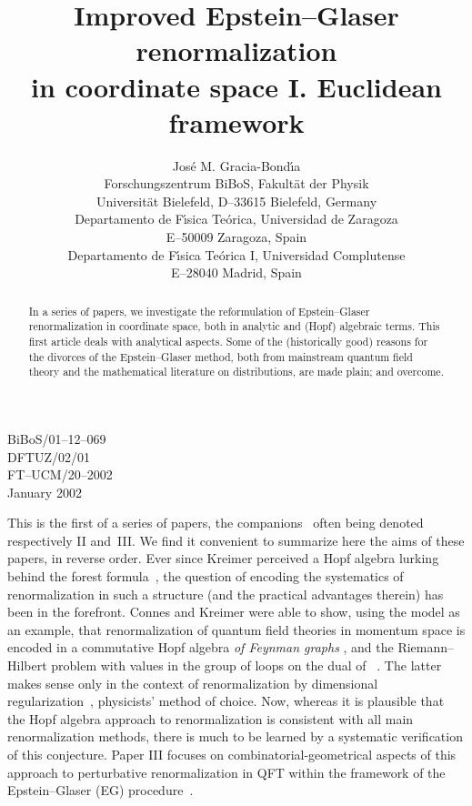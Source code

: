 \documentclass[a4paper,12pt]{article}
\title{Improved Epstein--Glaser renormalization\\
in coordinate space I. Euclidean framework}
\author{
Jos\'e M. Gracia-Bond\'{\i}a\myHighlight{$^{a,b,c}$}\coordHE{}
\\[1pc]
\myHighlight{$^a\,$}\coordHE{}Forschungszentrum BiBoS, Fakult\"at der Physik\\
Universit\"at Bielefeld, D--33615 Bielefeld, Germany\\
\myHighlight{$^b\,$}\coordHE{}Departamento de F\'{\i}sica Te\'orica, Universidad de Zaragoza\\
E--50009 Zaragoza, Spain\\
\myHighlight{$^c\,$}\coordHE{}Departamento de F\'{\i}sica Te\'orica I, Universidad Complutense\\
E--28040 Madrid, Spain
\\[1pc]
}
\makeatletter
\def\section{\@startsection{section}{1}{\z@}{-3.5ex plus -1ex minus
  -.2ex}{2.3ex plus .2ex}{\large\bf}}
\renewcommand{\H}{\mathcal{H}}     %
\providecommand{\7}{\dagger}           %
\theoremstyle{plain}
\theoremstyle{definition}
\let\savednewpage=\newpage
\providecommand{\fakenewpage}{\relax}
\providecommand{\suppressnewpage}{\let\newpage=\fakenewpage}
\providecommand{\restorenewpage}{\let\newpage=\savednewpage}
\makeatother
\begin{document}
\begin{flushright}
BiBoS/01--12--069\\
DFTUZ/02/01\\
FT--UCM/20--2002\\
January 2002
\end{flushright}


\suppressnewpage  %
\maketitle
\restorenewpage   %

\vskip 1.5cm


\begin{abstract}
In a series of papers, we investigate the reformulation of
Epstein--Glaser renormalization in coordinate space, both in analytic
and (Hopf) algebraic terms. This first article deals with analytical
aspects. Some of the (historically good) reasons for the divorces of
the Epstein--Glaser method, both from mainstream quantum field theory
and the mathematical literature on distributions, are made plain; and
overcome.
\end{abstract}


\section{Introduction}
\label{sec:introibo}


This is the first of a series of papers, the
companions~\cite{Bettina,Flora} often being denoted respectively II
and~III.
\vfill\eject
We find it convenient to summarize here the aims of these papers, in
reverse order. Ever since Kreimer perceived a Hopf algebra lurking
behind the forest formula~\cite{DirkOriginal}, the question of
encoding the systematics of renormalization in such a structure (and
the practical advantages therein) has been in the forefront. Connes
and Kreimer were able to show, using the \coordHE{} model as an
example, that renormalization of quantum field theories in momentum
space is encoded in a commutative Hopf algebra \textit{of Feynman
graphs} \myHighlight{$\H$}\coordHE{}, and the Riemann--Hilbert problem with values in the
group of loops on the dual of \myHighlight{$\H$}\coordHE{}~\cite{CKI,CKII}. The latter makes
sense only in the context of renormalization by dimensional
regularization~\cite{Orange,ArgentinaBrasiu}, physicists' method of
choice. Now, whereas it is plausible that the Hopf algebra approach to
renormalization is consistent with all main renormalization methods,
there is much to be learned by a systematic verification of this
conjecture. Paper III focuses on combinatorial-geometrical aspects of
this approach to perturbative renormalization in QFT within the
framework of the Epstein--Glaser (EG) procedure~\cite{EG}.
\end{document}

